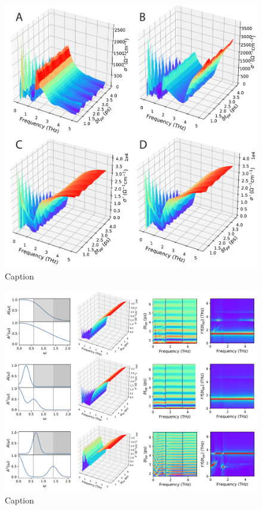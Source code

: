 \documentclass[aps,prb,reprint,noeprint,superscriptaddress]{revtex4-1}
\begin{document}
\begin{figure}[ht]
  \centering
  \includegraphics[width=\columnwidth]{figures/fig-cond-2d-fourcases}
  \caption{Caption}
\end{figure}
\begin{figure}[ht]
  \centering
  \includegraphics[width=\textwidth]{figures/fig-three-pulses}
  \caption{Caption}
\end{figure}
\end{document}
